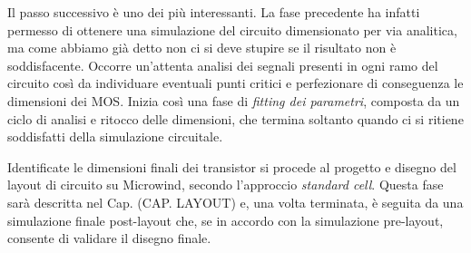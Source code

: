 Il passo successivo è uno dei più interessanti. La fase precedente ha infatti permesso di ottenere una simulazione del circuito dimensionato per via analitica, ma come abbiamo già detto non ci si deve stupire se il risultato non è soddisfacente. Occorre un'attenta analisi dei segnali presenti in ogni ramo del circuito così da individuare eventuali punti critici e perfezionare di conseguenza le dimensioni dei MOS. Inizia così una fase di \textit{fitting dei parametri}, composta da un ciclo di analisi e ritocco delle dimensioni, che termina soltanto quando ci si ritiene soddisfatti della simulazione circuitale. 

Identificate le dimensioni finali dei transistor si procede al progetto e disegno del layout di circuito su Microwind, secondo l'approccio \textit{standard cell}. Questa fase sarà descritta nel Cap. (CAP. LAYOUT) e, una volta terminata, è seguita da una simulazione finale post-layout che, se in accordo con la simulazione pre-layout, consente di validare il disegno finale. 








